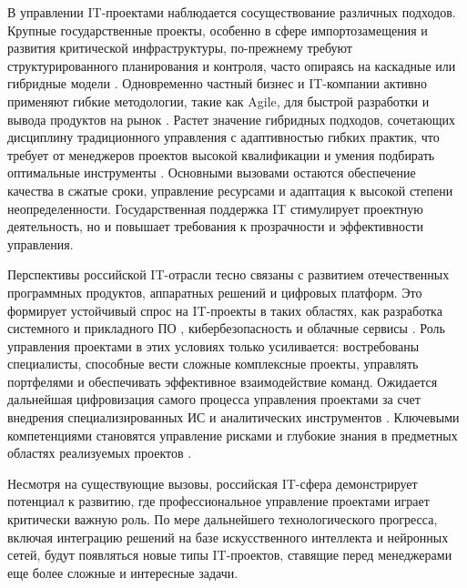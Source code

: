 В управлении IT-проектами наблюдается сосуществование различных подходов. Крупные государственные проекты, особенно в сфере импортозамещения и развития критической инфраструктуры, по-прежнему требуют структурированного планирования и контроля, часто опираясь на каскадные или гибридные модели \cite{management2}. Одновременно частный бизнес и IT-компании активно применяют гибкие методологии, такие как Agile, для быстрой разработки и вывода продуктов на рынок . Растет значение гибридных подходов, сочетающих дисциплину традиционного управления с адаптивностью гибких практик, что требует от менеджеров проектов высокой квалификации и умения подбирать оптимальные инструменты . Основными вызовами остаются обеспечение качества в сжатые сроки, управление ресурсами и адаптация к высокой степени неопределенности.
Государственная поддержка IT стимулирует проектную деятельность, но и повышает требования к прозрачности и эффективности управления.

Перспективы российской IT-отрасли тесно связаны с развитием отечественных программных продуктов, аппаратных решений и цифровых платформ. Это формирует устойчивый спрос на IT-проекты в таких областях, как разработка системного и прикладного ПО \cite{architecture1}, кибербезопасность и облачные сервисы \cite{management10}. Роль управления проектами в этих условиях только усиливается: востребованы специалисты, способные вести сложные комплексные проекты, управлять портфелями и обеспечивать эффективное взаимодействие команд.
Ожидается дальнейшая цифровизация самого процесса управления проектами за счет внедрения специализированных ИС и аналитических инструментов \cite{devops1}. Ключевыми компетенциями становятся управление рисками и глубокие знания в предметных областях реализуемых проектов \cite{management6}.

Несмотря на существующие вызовы, российская IT-сфера демонстрирует потенциал к развитию, где профессиональное управление проектами играет критически важную роль. По мере дальнейшего технологического прогресса, включая интеграцию решений на базе искусственного интеллекта и нейронных сетей, будут появляться новые типы IT-проектов, ставящие перед менеджерами еще более сложные и интересные задачи.